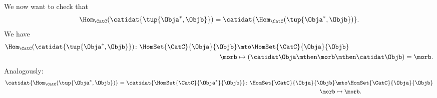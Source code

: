 We now want to check that
\begin{equation}
    \label{eq:hom_identity}
    \Hom_{\CatC}(\catidat{\tup{\Obja^*,\Objb}})=\catidat{\Hom_{\CatC}(\tup{\Obja^*,\Objb})}.
\end{equation}
%
We have
%
\begin{equation}
    \begin{aligned}
        \Hom_{\CatC}(\catidat{\tup{\Obja^*,\Objb}})\colon \HomSet{\CatC}{\Obja}{\Objb} & \mto \HomSet{\CatC}{\Obja}{\Objb} \\
        \morb                                                                          & \mapsto (\catidat\Obja \mthen \morb \mthen \catidat\Objb)=\morb.
    \end{aligned}
\end{equation}
%
Analogously:
%
\begin{equation}
    \begin{aligned}
        \catidat{\Hom_{\CatC}(\tup{\Obja^*,\Objb})}=\catidat{\HomSet{\CatC}{\Obja^*}{\Objb}} \colon \HomSet{\CatC}{\Obja}{\Objb} & \mto \HomSet{\CatC}{\Obja}{\Objb} \\
        \morb                                                                                                                    & \mapsto \morb.
    \end{aligned}
\end{equation}

\devel{}
